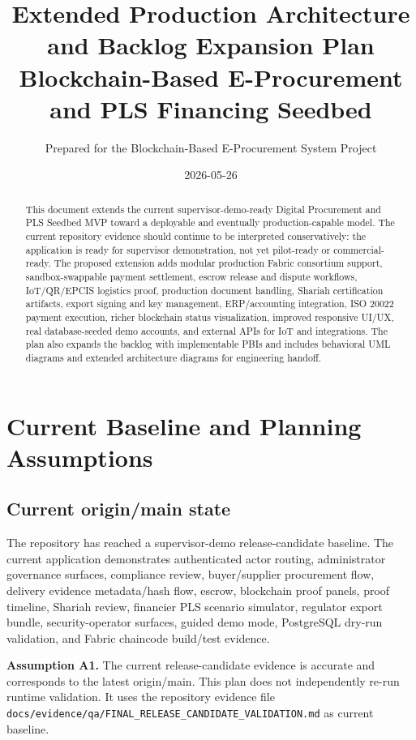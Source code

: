 \documentclass[11pt]{article}
\title{Extended Production Architecture and Backlog Expansion Plan\\\large Blockchain-Based E-Procurement and PLS Financing Seedbed}
\author{Prepared for the Blockchain-Based E-Procurement System Project}
\date{2026-05-26}
\newcommand{\code}[1]{\texttt{#1}}
\begin{document}
\maketitle

\begin{abstract}
This document extends the current supervisor-demo-ready Digital Procurement and PLS Seedbed MVP toward a deployable and eventually production-capable model. The current repository evidence should continue to be interpreted conservatively: the application is ready for supervisor demonstration, not yet pilot-ready or commercial-ready. The proposed extension adds modular production Fabric consortium support, sandbox-swappable payment settlement, escrow release and dispute workflows, IoT/QR/EPCIS logistics proof, production document handling, Shariah certification artifacts, export signing and key management, ERP/accounting integration, ISO 20022 payment execution, richer blockchain status visualization, improved responsive UI/UX, real database-seeded demo accounts, and external APIs for IoT and integrations. The plan also expands the backlog with implementable PBIs and includes behavioral UML diagrams and extended architecture diagrams for engineering handoff.
\end{abstract}

\tableofcontents
\newpage

\section{Current Baseline and Planning Assumptions}

\subsection{Current origin/main state}
The repository has reached a supervisor-demo release-candidate baseline. The current application demonstrates authenticated actor routing, administrator governance surfaces, compliance review, buyer/supplier procurement flow, delivery evidence metadata/hash flow, escrow, blockchain proof panels, proof timeline, Shariah review, financier PLS scenario simulator, regulator export bundle, security-operator surfaces, guided demo mode, PostgreSQL dry-run validation, and Fabric chaincode build/test evidence.

\textbf{Assumption A1.} The current release-candidate evidence is accurate and corresponds to the latest origin/main. This plan does not independently re-run runtime validation. It uses the repository evidence file \code{docs/evidence/qa/FINAL\_RELEASE\_CANDIDATE\_VALIDATION.md} as current baseline.
\end{document}
